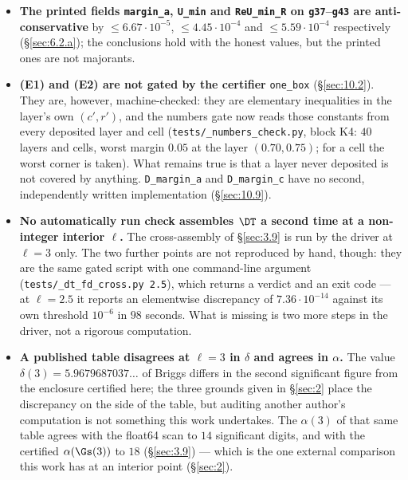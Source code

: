\begin{itemize}
\item \textbf{The printed fields \texttt{margin\_a}, \texttt{U\_min} and
  \texttt{ReU\_min\_R} on \texttt{g37}--\texttt{g43} are anti-conservative} by
  $\le 6.67\cdot10^{-5}$, $\le 4.45\cdot10^{-4}$ and $\le 5.59\cdot10^{-4}$ respectively (\S\ref{sec:6.2.a}); the conclusions hold with the
  honest values, but the printed ones are not majorants.
\item \textbf{(E1) and (E2) are not gated by the certifier}
  \texttt{one\_box} (\S\ref{sec:10.2}). They are, however, machine-checked:
  they are elementary inequalities in the layer's own $(c', r')$, and the
  numbers gate now reads those constants from every deposited layer and cell
  (\texttt{tests/\allowbreak \_\allowbreak numbers\_\allowbreak check.py},
  block K4: $40$ layers and cells, worst margin $0.05$ at the layer
  $(0.70, 0.75)$; for a cell the worst corner is taken). What remains true is
  that a layer never deposited is not covered by anything.
  \texttt{D\_margin\_a} and
  \texttt{D\_margin\_c} have no second, independently written implementation
  (\S\ref{sec:10.9}).
\item \textbf{No automatically run check assembles $\DT$ a second time at a
  non-integer interior $\ell$.} The cross-assembly of \S\ref{sec:3.9} is run by
  the driver at $\ell = 3$ only. The two further points are not reproduced by
  hand, though: they are the same gated script with one command-line argument
  (\texttt{tests/\allowbreak \_\allowbreak dt\_\allowbreak fd\_\allowbreak cross.py 2.5}),
  which returns a verdict and an exit code --- at $\ell = 2.5$ it reports an
  elementwise discrepancy of $7.36\cdot 10^{-14}$ against its own threshold
  $10^{-6}$ in $98$ seconds. What is missing is two more steps in the driver,
  not a rigorous computation.
\item \textbf{A published table disagrees at $\ell = 3$ in $\delta$ and agrees
  in $\alpha$.} The value $\delta(3) = 5.9679687037\ldots$ of Briggs
  \cite{briggs1991precise} differs in the second significant figure from the
  enclosure certified here; the three grounds given in \S\ref{sec:2} place the
  discrepancy on the side of the table, but auditing another author's
  computation is not something this work undertakes. The $\alpha(3)$ of that
  same table agrees with the float64 scan to $14$ significant digits, and with
  the certified $\alpha(\Gs(3))$ to $18$ (\S\ref{sec:3.9}) --- which is the
  one external comparison this work has at an interior point (\S\ref{sec:2}).
\end{itemize}

